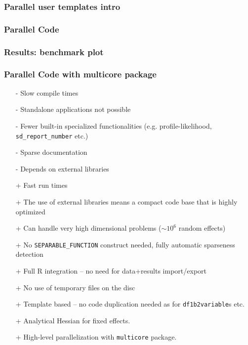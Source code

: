 \documentclass[compress]{beamer}
\begin{document}
\begin{frame}
  \frametitle{Parallel user templates intro}
\end{frame}

\begin{frame}
  \frametitle{Parallel Code}
\end{frame}

\begin{frame}
  \frametitle{Results: benchmark plot}
\end{frame}


\begin{frame}
  \frametitle{Parallel Code with multicore package}
\end{frame}


\begin{frame}
  \begin{itemize}
    \item[-] Slow compile times
    \item[-] Standalone applications not possible
    \item[-] Fewer built-in specialized functionalities (e.g. profile-likelihood, \texttt{sd\_report\_number} etc.)
    \item[-] Sparse documentation
    \item[-] Depends on external libraries
  \end{itemize}
\end{frame}

\begin{frame}
  \begin{itemize}
    \item[+] Fast run times
    \item[+] The use of external libraries means a compact code base that is highly optimized
    \item[+] Can handle very high dimensional problems ($\sim 10^6$ random effects)
    \item[+] No \texttt{SEPARABLE\_FUNCTION} construct needed, fully automatic sparseness detection
    \item[+] Full R integration -- no need for data+results import/export
    \item[+] No use of temporary files on the disc
    \item[+] Template based -- no code duplication needed as for \texttt{df1b2variable}s etc.
    \item[+] Analytical Hessian for fixed effects.
    \item[+] High-level parallelization with \texttt{multicore} package. 
  \end{itemize}
\end{frame}
\end{document}

